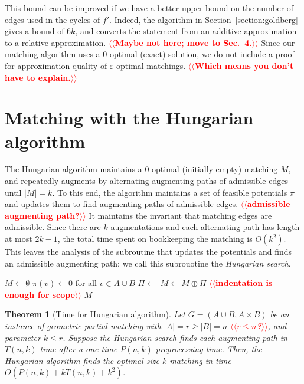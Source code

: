 \documentclass[11pt]{article}
\makeatletter
\def\eps{\varepsilon}
\theoremstyle{plain}
\newtheorem{theorem}{Theorem}
\def\n@te#1{\textsf{\boldmath \textbf{$\langle\!\langle$#1$\rangle\!\rangle$}}\leavevmode}
\def\note#1{\textcolor{red}{\n@te{#1}}}
\makeatother
\begin{document}
This bound can be improved if we have a better upper bound on the number of
edges used in the cycles of $f'$.
Indeed, the algorithm in Section~\ref{section:goldberg} gives a
bound of $6k$, and converts the statement from an additive approximation to a
relative approximation. \note{Maybe not here; move to Sec.\ 4.}
Since our matching algorithm uses a 0-optimal (exact) solution, we do not
include a proof for approximation quality of $\eps$-optimal matchings. \note{Which means you don't have to explain.}


\section{Matching with the Hungarian algorithm}
\label{section:hung}

The Hungarian algorithm maintains a 0-optimal (initially empty) matching $M$,
and repeatedly augments by alternating augmenting paths of admissible edges
until $|M| = k$.
To this end, the algorithm maintains a set of feasible potentials $\pi$ and
updates them to find augmenting paths of admissible edges. \note{admissible augmenting path?}
It maintains the invariant that matching edges are admissible.
Since there are $k$ augmentations and each alternating path has length at most
$2k-1$, the total time spent on bookkeeping the matching is $O(k^2)$.
This leaves the analysis of the subroutine that updates the potentials and
finds an admissible augmenting path; we call this subrouotine the \emph{Hungarian search}.

\begin{figure*}
\centering
\begin{minipage}{.7\linewidth}
\begin{algorithm}[H]
\caption{Hungarian algorithm}
\begin{algorithmic}[1]
	\State $M \gets \emptyset$
	\State $\pi(v) \gets 0$ for all $v \in A \cup B$
		\State $\Pi \gets$ 
		\State $M \gets M \oplus \Pi$
	\EndWhile \note{indentation is enough for scope}
	\State\Return $M$
\EndFunction
\end{algorithmic}
\end{algorithm}
\end{minipage}
\end{figure*}


\begin{theorem}[Time for Hungarian algorithm]
\label{theorem:hung_orig}
	Let $G = (A \cup B, A \times B)$ be an instance of geometric partial
	matching with $|A| = r \geq |B| = n$ \note{$r\le n$?}, and parameter $k \leq r$.
	Suppose the Hungarian search finds each augmenting path in $T(n, k)$
	time after a one-time $P(n, k)$ preprocessing time.
	Then, the Hungarian algorithm finds the optimal size $k$ matching in
	time $O(P(n, k) + k T(n, k) + k^2)$.
\end{theorem}
\end{document}
